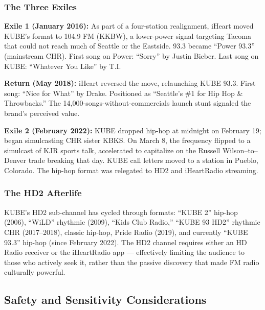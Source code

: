 \documentclass[11pt,letterpaper]{article}
\begin{document}
\subsubsection{The Three Exiles}

\textbf{Exile 1 (January 2016):} As part of a four-station realignment, iHeart moved KUBE's format to 104.9 FM (KKBW), a lower-power signal targeting Tacoma that could not reach much of Seattle or the Eastside. 93.3 became ``Power 93.3'' (mainstream CHR). First song on Power: ``Sorry'' by Justin Bieber. Last song on KUBE: ``Whatever You Like'' by T.I.

\textbf{Return (May 2018):} iHeart reversed the move, relaunching KUBE 93.3. First song: ``Nice for What'' by Drake. Positioned as ``Seattle's \#1 for Hip Hop \& Throwbacks.'' The 14,000-songs-without-commercials launch stunt signaled the brand's perceived value.

\textbf{Exile 2 (February 2022):} KUBE dropped hip-hop at midnight on February 19; began simulcasting CHR sister KBKS. On March 8, the frequency flipped to a simulcast of KJR sports talk, accelerated to capitalize on the Russell Wilson--to--Denver trade breaking that day. KUBE call letters moved to a station in Pueblo, Colorado. The hip-hop format was relegated to HD2 and iHeartRadio streaming.

\subsubsection{The HD2 Afterlife}
KUBE's HD2 sub-channel has cycled through formats: ``KUBE 2'' hip-hop (2006), ``WiLD'' rhythmic (2009), ``Kids Club Radio,'' ``KUBE 93 HD2'' rhythmic CHR (2017--2018), classic hip-hop, Pride Radio (2019), and currently ``KUBE 93.3'' hip-hop (since February 2022). The HD2 channel requires either an HD Radio receiver or the iHeartRadio app --- effectively limiting the audience to those who actively seek it, rather than the passive discovery that made FM radio culturally powerful.

\subsection{Safety and Sensitivity Considerations}
\end{document}
